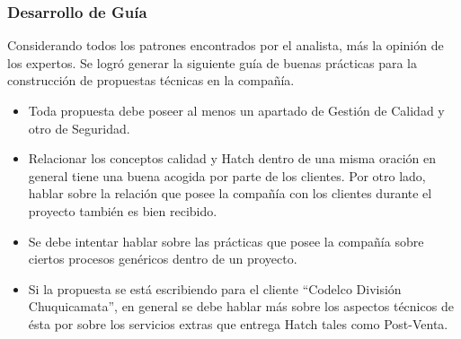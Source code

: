 \subsubsection{Desarrollo de Guía}
    Considerando todos los patrones encontrados por el analista, más la opinión de los expertos. Se logró generar la siguiente guía de buenas prácticas para la construcción de propuestas técnicas en la compañía.
    \begin{itemize}
        \item Toda propuesta debe poseer al menos un apartado de Gestión de Calidad y otro de Seguridad.
        \item Relacionar los conceptos calidad y Hatch dentro de una misma oración en general tiene una buena acogida por parte de los clientes. Por otro lado, hablar sobre la relación que posee la compañía con los clientes durante el proyecto también es bien recibido.
        \item Se debe intentar hablar sobre las prácticas que posee la compañía sobre ciertos procesos genéricos dentro de un proyecto.
        \item Si la propuesta se está escribiendo para el cliente ``Codelco División Chuquicamata'', en general se debe hablar más sobre los aspectos técnicos de ésta por sobre los servicios extras que entrega Hatch tales como Post-Venta.
    \end{itemize}
